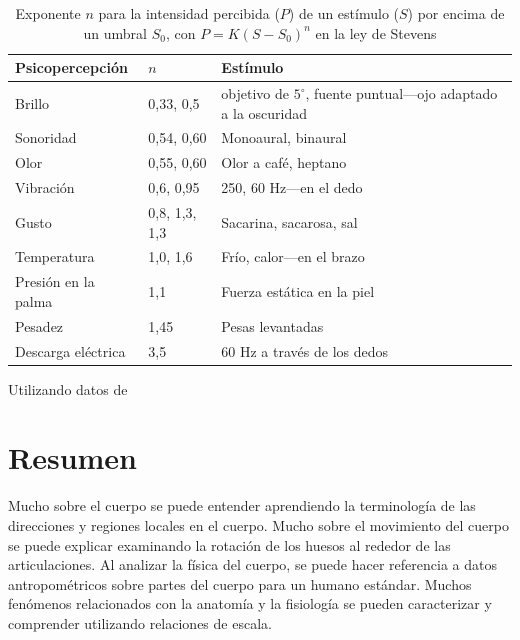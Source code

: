 \documentclass[12pt]{book}
\begin{document}
\begin{table}[htbp]
\centering
\caption{Exponente $n$ para la intensidad percibida ($P$) de un estímulo ($S$) por encima de un umbral $S_0$, con $P = K(S - S_0)^n$ en la ley de Stevens}
\label{tab:115}
\begin{tabularx}{\textwidth}{lXX}
\toprule
\textbf{Psicopercepción} & \textbf{$n$} & \textbf{Estímulo} \\
\midrule
Brillo & 0,33, 0,5 & objetivo de $5^\circ$, fuente puntual---ojo adaptado a la oscuridad \\
Sonoridad & 0,54, 0,60 & Monoaural, binaural \\
Olor & 0,55, 0,60 & Olor a café, heptano \\
Vibración & 0,6, 0,95 & 250, 60 Hz---en el dedo \\
Gusto & 0,8, 1,3, 1,3 & Sacarina, sacarosa, sal \\
Temperatura & 1,0, 1,6 & Frío, calor---en el brazo \\
Presión en la palma & 1,1 & Fuerza estática en la piel \\
Pesadez & 1,45 & Pesas levantadas \\
Descarga eléctrica & 3,5 & 60 Hz a través de los dedos \\
\bottomrule
\end{tabularx}
\begin{flushleft}
    \small Utilizando datos de \cite{35, 36}
\end{flushleft}
\end{table}


\section{Resumen}

Mucho sobre el cuerpo se puede entender aprendiendo la terminología de las direcciones y regiones locales en el cuerpo. Mucho sobre el movimiento del cuerpo se puede explicar examinando la rotación de los huesos al rededor de las articulaciones. Al analizar la física del cuerpo, se puede hacer referencia a datos antropométricos sobre partes del cuerpo para un humano estándar. Muchos fenómenos relacionados con la anatomía y la fisiología se pueden caracterizar y comprender utilizando relaciones de escala.

\end{document}
